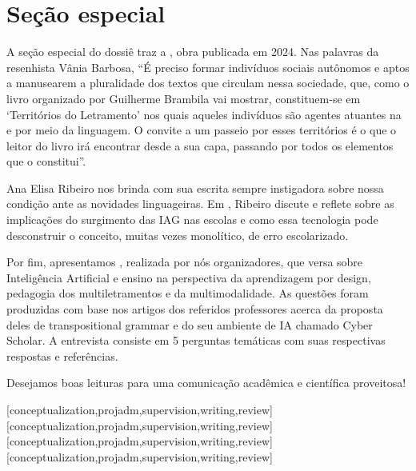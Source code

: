 \documentclass[portuguese]{textolivre}
\begin{document}
\section{Seção especial}

A seção especial do dossiê traz a , obra publicada em 2024. Nas palavras da resenhista Vânia Barbosa, “É preciso formar indivíduos sociais autônomos e aptos a manusearem a pluralidade dos textos que circulam nessa sociedade, que, como o livro organizado por Guilherme Brambila vai mostrar, constituem-se em ‘Territórios do Letramento’ nos quais aqueles indivíduos são agentes atuantes na e por meio da linguagem. O convite a um passeio por esses territórios é o que o leitor do livro irá encontrar desde a sua capa, passando por todos os elementos que o constitui”.

Ana Elisa Ribeiro nos brinda com sua escrita sempre instigadora sobre nossa condição ante as novidades linguageiras. Em , Ribeiro discute e reflete sobre as implicações do surgimento das IAG nas escolas e como essa tecnologia pode desconstruir o conceito, muitas vezes monolítico, de erro escolarizado.

Por fim, apresentamos , realizada por nós organizadores, que versa sobre Inteligência Artificial e ensino na perspectiva da aprendizagem por design, pedagogia dos multiletramentos e da multimodalidade. As questões foram produzidas com base nos artigos dos referidos professores acerca da proposta deles de transpositional grammar e do seu ambiente de IA chamado Cyber Scholar. A entrevista consiste em 5 perguntas temáticas com suas respectivas respostas e referências. 

Desejamos boas leituras para uma comunicação acadêmica e científica proveitosa!


\printbibliography\label{sec-bib}


\begin{contributors}
[conceptualization,projadm,supervision,writing,review]
[conceptualization,projadm,supervision,writing,review]
[conceptualization,projadm,supervision,writing,review]
[conceptualization,projadm,supervision,writing,review]
\end{contributors}

\begin{dataavailability}
\end{dataavailability}
\end{document}
